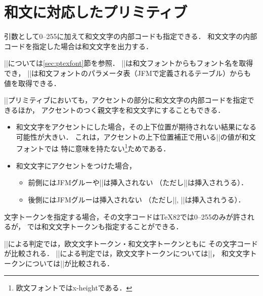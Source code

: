 \documentclass[a4paper,11pt,nomag,dvipdfmx]{jsarticle}
\begin{document}
\section{和文に対応したプリミティブ}
\begin{cslist}
 \csitem[\.{char} <character code>,
   \.{chardef} <control sequence>=<character code>]
  引数として0--255に加えて和文文字の内部コードも指定できる．
  和文文字の内部コードを指定した場合は和文文字を出力する．

  |\font|については\ref{sec:ptexfont}節を参照．
  |\fontname|は和文フォントからもフォント名を取得でき，
  |\fontdimen|は和文フォントのパラメータ表（JFMで定義されるテーブル）からも
  値を取得できる．

 \csitem[\.{accent} <character code>=<character>]
  |\accent|プリミティブにおいても，アクセントの部分に和文文字の内部コードを指定できるほか，
  アクセントのつく親文字を和文文字にすることもできる．
 \begin{itemize}
  \item 和文文字をアクセントにした場合，その上下位置が期待されない結果になる
    可能性が大きい．
    これは，アクセントの上下位置補正で用いる||の値が和文フォントでは
    特に意味を持たない\footnote{欧文フォントではx-heightである．}ためである．
  \item 和文文字にアクセントをつけた場合，
    \begin{itemize}
     \item 前側にはJFMグルーや|\kanjiskip|は挿入されない
           （ただし|\xkanjiskip|は挿入されうる）．
     \item 後側にはJFMグルーは挿入されない
           （ただし|\kanjiskip|, |\xkanjiskip|は挿入されうる）．
    \end{itemize}
 \end{itemize}

  文字トークンを指定する場合，その文字コードは\TeX82では0--255のみが許されるが，
  \pTeX では和文文字トークンも指定することができる．

  |\if|による判定では，欧文文字トークン・和文文字トークンともに
  その文字コードが比較される．
  |\ifcat|による判定では，欧文文字トークンについては|\catcode|，
  和文文字トークンについては|\kcatcode|が比較される．
\end{cslist}
\end{document}
